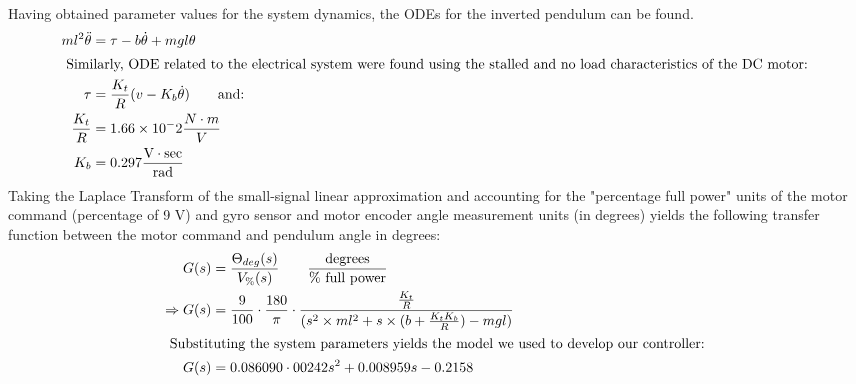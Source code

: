 \documentclass[11pt, a4paper,twocolumn]{article}
\begin{document}
%
Having obtained parameter values for the system dynamics, the ODEs for the inverted pendulum can be found. 
\begin{align*}
	ml^2\ddot{\theta} &= \tau - b\dot{\theta} + mgl\theta \\
	\intertext{ Similarly, ODE related to the electrical system were found using the stalled and no load characteristics of the DC motor: }	
	\tau &= \frac{K_t}{R}(v - K_b\dot{\theta}) \qquad\text{and:}	\\
	\frac{K_t}{R} &= 1.66 \times 10^-2 \frac{N\cdot m}{V}				\\
	K_b &= 0.297 \frac{\text{V}\cdot \text{sec}}{\text{rad}}
\end{align*}
	Taking the Laplace Transform of the small-signal linear approximation and accounting for the "percentage full power" units 	of the motor command (percentage of 9 V) and gyro sensor and motor encoder angle measurement units (in degrees) yields the following transfer function between the motor command and pendulum angle in degrees:
\begin{align*}
	G(s) &= \frac{\Theta_{deg}(s)}{V_\%(s)} \qquad \frac{\text{degrees}}{\text{\% full power}}	\\
	\Rightarrow G(s) &= \frac{9}{100}\cdot \frac{180}{\pi}\cdot \frac{\frac{K_t}{R}}{(s^2 \times ml^2 + s \times (b+ \frac{K_t 					K_b}{R}) - mgl)} \\
\intertext{
	Substituting the system parameters yields the model we used to develop our controller: 
}
	G(s) &= 0.086090\cdot 00242 s^2+ 0.008959 s - 0.2158
\end{align*}

\end{document}

